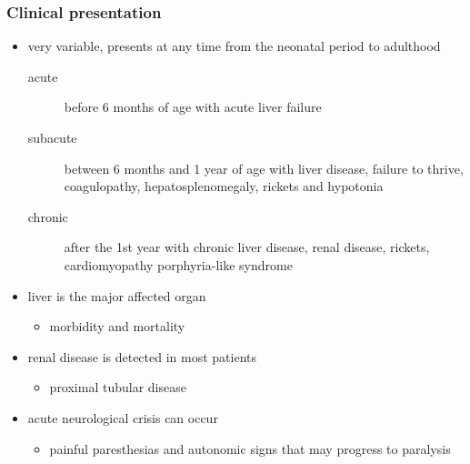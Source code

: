 \documentclass{scrartcl}
\begin{document}
\subsubsection{Clinical presentation}
\label{sec:org0da7d52}
\begin{itemize}
\item very variable, presents at any time from the neonatal period to adulthood
\begin{description}
\item[{acute}] before 6 months of age with acute liver failure
\item[{subacute}] between 6 months and 1 year of age with liver disease,
failure to thrive, coagulopathy, hepatosplenomegaly,
rickets and hypotonia
\item[{chronic}] after the 1st year with chronic liver disease, renal
disease, rickets, cardiomyopathy \textpm{} porphyria-like
syndrome
\end{description}

\item liver is the major affected organ
\begin{itemize}
\item morbidity and mortality
\end{itemize}
\item renal disease is detected in most patients
\begin{itemize}
\item proximal tubular disease
\end{itemize}
\item acute neurological crisis can occur
\begin{itemize}
\item painful paresthesias and autonomic signs that may progress to
paralysis
\end{itemize}
\end{itemize}
\end{document}
